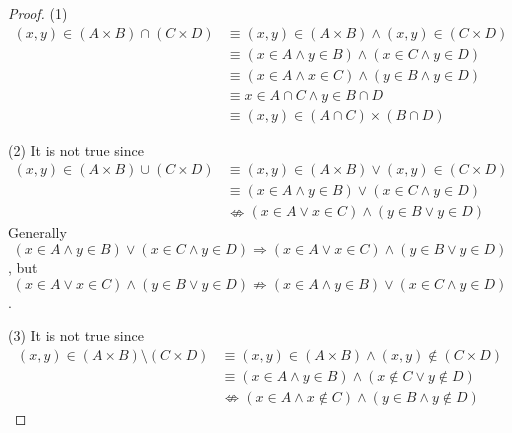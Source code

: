 \begin{proof}
(1)
\begin{align*}
(x,y) \in (A \times B) \cap (C \times D) 
&\equiv (x,y) \in (A \times B) \wedge (x,y) \in (C \times D) \\
&\equiv (x \in A \wedge y \in B) \wedge (x \in C \wedge y \in D) \\
&\equiv (x \in A \wedge x \in C) \wedge (y \in B \wedge y \in D) \\
&\equiv x \in A \cap C \wedge y \in B \cap D \\
&\equiv (x,y) \in (A \cap C) \times (B \cap D)
\end{align*}

(2) It is not true since 
\begin{align*}
(x,y) \in (A \times B) \cup (C \times D) 
&\equiv (x,y) \in (A \times B) \vee (x,y) \in (C \times D) \\
&\equiv (x \in A \wedge y \in B) \vee (x \in C \wedge y \in D) \\
&\nLeftrightarrow (x \in A \vee x \in C) \wedge (y \in B \vee y \in D)
\end{align*}
Generally 
\[
(x \in A \wedge y \in B) \vee (x \in C \wedge y \in D) \Longrightarrow 
(x \in A \vee x \in C) \wedge (y \in B \vee y \in D)
\], 
but
\[
(x \in A \vee x \in C) \wedge (y \in B \vee y \in D) \nRightarrow
(x \in A \wedge y \in B) \vee (x \in C \wedge y \in D)
\].

(3) It is not true since
\begin{align*}
(x,y) \in (A \times B) \setminus (C \times D) 
&\equiv (x,y) \in (A \times B) \wedge (x,y) \notin (C \times D) \\
&\equiv (x \in A \wedge y \in B) \wedge (x \notin C \vee y \notin D) \\
&\nLeftrightarrow (x \in A \wedge x \notin C) \wedge (y \in B \wedge y \notin D)
\end{align*}
\end{proof}

